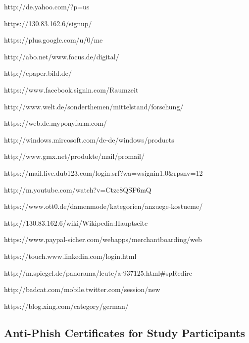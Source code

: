http://de.yahoo.com/?p=us

https://130.83.162.6/signup/

https://plus.google.com/u/0/me

http://abo.net/www.focus.de/digital/

http://epaper.bild.de/

https://www.facebook.signin.com/Raumzeit

http://www.welt.de/sonderthemen/mittelstand/forschung/

https://web.de.myponyfarm.com/

http://windows.mircosoft.com/de-de/windows/products

http://www.gmx.net/produkte/mail/promail/

https://mail.live.dub123.com/login.srf?wa=wsignin1.0&rpsnv=12

http://m.youtube.com/watch?v=Ctzc8QSF6mQ

https://www.ott0.de/damenmode/kategorien/anzuege-kostueme/

http://130.83.162.6/wiki/Wikipedia:Hauptseite

https://www.paypal-sicher.com/webapps/merchantboarding/web

https://touch.www.linkedin.com/login.html

http://m.spiegel.de/panorama/leute/a-937125.html#spRedire

http://badcat.com/mobile.twitter.com/session/new

https://blog.xing.com/category/german/


\subsection{Anti-Phish Certificates for Study Participants}
\label{s:antiphish_certs}



